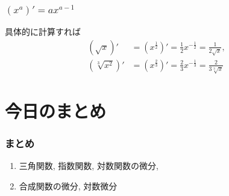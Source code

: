 \documentclass[dvipdfmx,cjk,10.2pt]{beamer}
\theoremstyle{definition}
\begin{document}


\begin{frame}
\frametitle{$(x^a)'=ax^{a-1}$}


具体的に計算すれば
\begin{align*}
(\sqrt{x})' &= (x^{\frac{1}{2}})'=\frac{1}{2}x^{-\frac{1}{2}}= \frac{1}{2 \sqrt{x}}, \\
(\sqrt[3]{x^2})' &= (x^{\frac{2}{3}})'=\frac{2}{3}x^{-\frac{1}{3}}= \frac{2}{3 \sqrt[3]{x}}
\end{align*}


\end{frame}







\section{今日のまとめ}
\begin{frame}
\frametitle{まとめ}   


\begin{enumerate}
\item 三角関数, 指数関数, 対数関数の微分,
\item 合成関数の微分, 対数微分
\end{enumerate} 


\end{frame}
\end{document}
